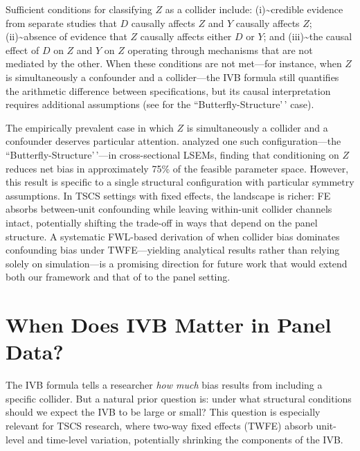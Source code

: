 \documentclass[
]{article}
\begin{document}
Sufficient conditions for classifying \(Z\) as a collider include:
(i)\textasciitilde credible evidence from separate studies that \(D\)
causally affects \(Z\) and \(Y\) causally affects \(Z\);
(ii)\textasciitilde absence of evidence that \(Z\) causally affects
either \(D\) or \(Y\); and (iii)\textasciitilde the causal effect of
\(D\) on \(Z\) and \(Y\) on \(Z\) operating through mechanisms that are
not mediated by the other. When these conditions are not met---for
instance, when \(Z\) is simultaneously a confounder and a collider---the
IVB formula still quantifies the arithmetic difference between
specifications, but its causal interpretation requires additional
assumptions (see \citealt{ding2015adjust} for the
``Butterfly-Structure'\,' case).

The empirically prevalent case in which \(Z\) is simultaneously a
collider and a confounder deserves particular attention.
\citet{ding2015adjust} analyzed one such configuration---the
``Butterfly-Structure'\,'---in cross-sectional LSEMs, finding that
conditioning on \(Z\) reduces net bias in approximately 75\% of the
feasible parameter space. However, this result is specific to a single
structural configuration with particular symmetry assumptions. In TSCS
settings with fixed effects, the landscape is richer: FE absorbs
between-unit confounding while leaving within-unit collider channels
intact, potentially shifting the trade-off in ways that depend on the
panel structure. A systematic FWL-based derivation of when collider bias
dominates confounding bias under TWFE---yielding analytical results
rather than relying solely on simulation---is a promising direction for
future work that would extend both our framework and that of
\citet{ding2015adjust} to the panel setting.

\section{\texorpdfstring{When Does IVB Matter in Panel Data?
\label{sec:ivb_magnitude}}{When Does IVB Matter in Panel Data? }}\label{when-does-ivb-matter-in-panel-data}

The IVB formula tells a researcher \emph{how much} bias results from
including a specific collider. But a natural prior question is: under
what structural conditions should we expect the IVB to be large or
small? This question is especially relevant for TSCS research, where
two-way fixed effects (TWFE) absorb unit-level and time-level variation,
potentially shrinking the components of the IVB.
\end{document}

